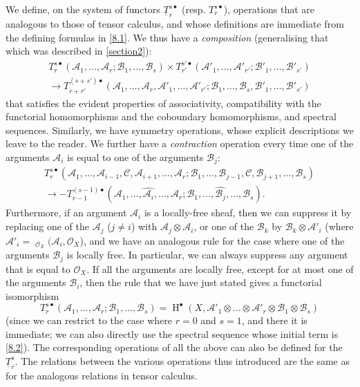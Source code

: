 \documentclass{article}
\theoremstyle{plain}
\theoremstyle{definition}
\newcommand{\sh}[1]{{\mathscr{#1}}}
\DeclareMathOperator{\shHom}{\underline{Hom}}
\DeclareMathOperator{\HH}{H}
\newcommand{\oldpage}[1]{\marginpar{\footnotesize$\Big\vert$ \textit{p.~#1}}}
\begin{document}
We define, on the system of functors $\underline{T}_r^{s\bullet}$ (resp. $T_r^{s\bullet}$), operations that are analogous to those of tensor calculus, and whose definitions are immediate from the defining formulas in \cref{8.1}.
We thus have a \emph{composition} (generalising that which was described in \cref{section2}):
\[
\label{8.3}
  \begin{gathered}
    T_r^{s\bullet}(\sh{A}_1,\ldots,\sh{A}_r;\sh{B}_1,\ldots,\sh{B}_s)
    \times T_{r'}^{s'\bullet}(\sh{A}'_1,\ldots,\sh{A}'_{r'};\sh{B}'_1,\ldots,\sh{B}'_{s'})
  \\\to T_{r+r'}^{(s+s')\bullet}(\sh{A}_1,\ldots,\sh{A}_r,\sh{A}'_1,\ldots,\sh{A}'_{r'};\sh{B}_1,\ldots,\sh{B}_s,\sh{B}'_1,\ldots,\sh{B}'_{s'})
  \end{gathered}
\tag{8.3}
\]
that satisfies the evident properties of associativity, compatibility with the functorial homomorphisms and the coboundary homomorphisms, and spectral sequences.
Similarly, we have symmetry operations, whose explicit descriptions we leave to the reader.
We further have a \emph{contraction} operation every time one of the arguments $\sh{A}_i$
\oldpage{149-23}
is equal to one of the arguments $\sh{B}_j$:
\[
\label{8.4}
  \begin{gathered}
    T_r^{s\bullet}(\sh{A}_1,\ldots,\sh{A}_{i-1},\sh{C},\sh{A}_{i+1},\ldots,\sh{A}_r;\sh{B}_1,\ldots,\sh{B}_{j-1},\sh{C},\sh{B}_{j+1},\ldots,\sh{B}_s)
  \\\to -T_{r-1}^{(s-1)\bullet}(\sh{A}_1,\ldots,\widehat{\sh{A}_i},\ldots,\sh{A}_r;\sh{B}_1,\ldots,\widehat{\sh{B}_j},\ldots,\sh{B}_s).
  \end{gathered}
\tag{8.4}
\]
Furthermore, if an argument $\sh{A}_i$ is a locally-free sheaf, then we can suppress it by replacing one of the $\sh{A}_j$ ($j\neq i$) with $\sh{A}_j\otimes\sh{A}_i$, or one of the $\sh{B}_k$ by $\sh{B}_k\otimes\sh{A}'_i$ (where $\sh{A}'_i=\shHom_{\sh{O}_X}(\sh{A}_i,\sh{O}_X$), and we have an analogous rule for the case where one of the arguments $\sh{B}_j$ is locally free.
In particular, we can always suppress any argument that is equal to $\sh{O}_X$.
If all the arguments are locally free, except for at most one of the arguments $\sh{B}_i$, then the rule that we have just stated gives a functorial isomorphism
\[
\label{8.5}
  T_r^{s\bullet}(\sh{A}_1,\ldots,\sh{A}_r;\sh{B}_1,\ldots,\sh{B}_s)
  = \HH^\bullet(X,\sh{A}'_1\otimes\ldots\otimes\sh{A}'_{r}\otimes\sh{B}_1\otimes\sh{B}_s)
\tag{8.5}
\]
(since we can restrict to the case where $r=0$ and $s=1$, and there it is immediate; we can also directly use the spectral sequence whose initial term is \cref{8.2}).
The corresponding operations of all the above can also be defined for the $\underline{T}_r^s$.
The relations between the various operations thus introduced are the same as for the analogous relations in tensor calculus.
\end{document}
